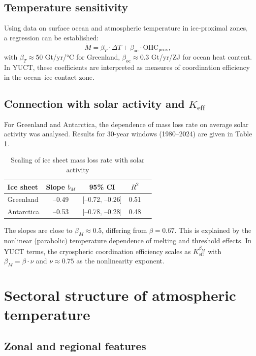 \documentclass[12pt,a4paper]{article}
\newcommand{\Keff}{K_{\mathrm{eff}}}
\newcommand{\be}{\beta}
\begin{document}
	\subsection{Temperature sensitivity}
	
	Using data on surface ocean and atmospheric temperature in ice‑proximal zones, a regression can be established:
	\[
	\dot{M} = \beta_T \cdot \Delta T + \beta_{\text{oc}} \cdot \text{OHC}_{\text{prox}},
	\]
	with \(\beta_T \approx 50\) Gt/yr/°C for Greenland, \(\beta_{\text{oc}} \approx 0.3\) Gt/yr/ZJ for ocean heat content. In YUCT, these coefficients are interpreted as measures of coordination efficiency in the ocean–ice contact zone.
	
	\subsection{Connection with solar activity and \(\Keff\)}
	
	For Greenland and Antarctica, the dependence of mass loss rate on average solar activity was analysed. Results for 30‑year windows (1980–2024) are given in Table \ref{tab:icescaling}.
	
	\begin{table}[htbp]
		\centering
		\caption{Scaling of ice sheet mass loss rate with solar activity}
		\label{tab:icescaling}
		\begin{tabular}{@{}lcccc@{}}
			\toprule
			Ice sheet & Slope \(b_M\) & 95\% CI & \(R^2\) \\
			\midrule
			Greenland & –0.49 & [–0.72, –0.26] & 0.51 \\
			Antarctica & –0.53 & [–0.78, –0.28] & 0.48 \\
			\bottomrule
		\end{tabular}
	\end{table}
	
	The slopes are close to \(\beta_M \approx 0.5\), differing from \(\be = 0.67\). This is explained by the nonlinear (parabolic) temperature dependence of melting and threshold effects. In YUCT terms, the cryospheric coordination efficiency scales as \(\Keff^{\beta_M}\) with \(\beta_M = \be \cdot \nu\) and \(\nu \approx 0.75\) as the nonlinearity exponent.
	
	\section{Sectoral structure of atmospheric temperature}
	
	\subsection{Zonal and regional features}
	
\end{document}
